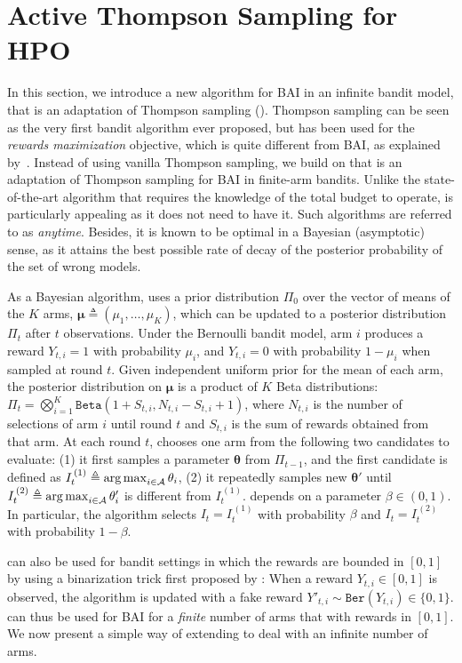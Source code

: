 \section{Active Thompson Sampling for HPO}\label{sec:dttts.algorithm}

In this section, we introduce a new algorithm for BAI in an infinite bandit model, that is an adaptation of Thompson sampling (\citealp{thompson1933}). Thompson sampling can be seen as the very first bandit algorithm ever proposed, but has been used for the \emph{rewards maximization} objective, which is quite different from BAI, as explained by~\cite{bubeck2009pure}. Instead of using vanilla Thompson sampling, we build on \TTTS that is an adaptation of Thompson sampling for BAI in finite-arm bandits. Unlike the state-of-the-art algorithm \SHA that requires the knowledge of the total budget to operate, \TTTS is particularly appealing as it does not need to have it. Such algorithms are referred to as \emph{anytime}. Besides, it is known to be optimal in a Bayesian (asymptotic) sense, as it attains the best possible rate of decay of the posterior probability of the set of wrong models. 

As a Bayesian algorithm, \TTTS uses a prior distribution $\Pi_0$ over the vector of means of the $K$ arms, $\bm\mu \triangleq (\mu_1,\dots,\mu_K)$, which can be updated to a posterior distribution $\Pi_t$ after $t$ observations. Under the Bernoulli bandit model, arm $i$ produces a reward $Y_{t,i}=1$ with probability $\mu_i$, and $Y_{t,i}=0$ with probability $1-\mu_i$ when sampled at round $t$. Given independent uniform prior for the mean of each arm, the posterior distribution on $\bm\mu$ is a product of $K$ Beta distributions: $\Pi_t = \bigotimes_{i=1}^{K} \texttt{Beta}(1+S_{t,i},N_{t,i}-S_{t,i}+1)$, where $N_{t,i}$ is the number of selections of arm $i$ until round $t$ and $S_{t,i}$ is the sum of rewards obtained from that arm. At each round $t$, \TTTS chooses one arm from the following two candidates to evaluate: (1) it first samples a parameter ${\bm\theta}$ from $\Pi_{t-1}$, and the first candidate is defined as $I_t^{\,(1)} \triangleq \operatorname*{arg\,max}_{i\in\mathcal{A}} {\theta}_i$, (2) it repeatedly samples new ${\bm\theta}'$ until $I_t^{\,(2)} \triangleq \operatorname*{arg\,max}_{i\in\mathcal{A}} \theta_i'$ is different from $I_t^{\,(1)}$. \TTTS depends on a parameter $\beta \in (0,1)$. In particular, the algorithm selects $I_t = I_t^{\,(1)}$ with probability $\beta$ and $I_t = I_t^{\,(2)}$ with probability $1-\beta$.

\TTTS can also be used for bandit settings in which the rewards are bounded in $[0,1]$ by using a binarization trick first proposed by \cite{agrawal2012analysis}: When a reward $Y_{t,i} \in [0,1]$ is observed, the algorithm is updated with a fake reward  $Y'_{t,i} \sim \texttt{Ber}(Y_{t,i}) \in \{0,1\}$. \TTTS can thus be used for BAI for a \emph{finite} number of arms that with rewards in $[0,1]$. We now present a simple way of extending \TTTS to deal with an infinite number of arms.

